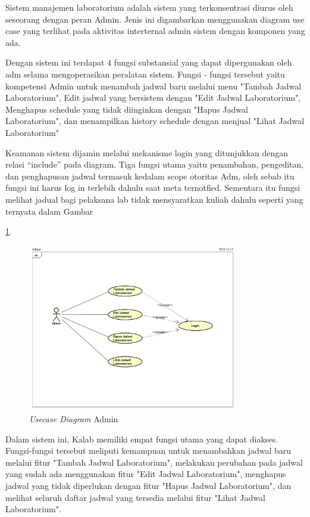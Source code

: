Sistem manajemen laboratorium adalah sistem yang terkonsentrasi diurus oleh seseorang dengan peran Admin. Jenis ini digambarkan menggunakan diagram use case yang terlihat pada aktivitas interternal admin sistem dengan komponen yang ada.

Dengan sistem ini terdapat 4 fungsi substansial yang dapat dipergunakan oleh adm selama mengoperasikan peralatan sistem. Fungsi - fungsi tersebut yaitu kompetensi Admin untuk menambah jadwal baru melalui menu "Tambah Jadwal Laboratorium", Edit jadwal yang bersistem dengan "Edit Jadwal Laboratorium", Menghapus schedule yang tidak diinginkan dengan "Hapus Jadwal Laboratorium", dan menampilkan history schedule dengan menjual "Lihat Jadwal Laboratorium"

Keamanan sistem dijamin melalui mekanisme login yang ditunjukkan dengan relasi “include” pada diagram. Tiga fungsi utama yaitu penambahan, pengeditan, dan penghapusan jadwal termasuk kedalam scope otoritas Adm, oleh sebab itu fungsi ini harus log in terlebih dahulu saat meta ternotfied. Sementara itu fungsi melihat jadual bagi pelaksana lab tidak mensyaratkan kuliah dahulu seperti yang ternyata dalam Gambar

\ref{usecase-diagram-admin}.
\begin{figure}
	\centering
	\includegraphics[width=0.82\textwidth]{konten/gambar/usecase-diagram/admin.png}
	\caption{\textit{Usecase Diagram} Admin}
	\label{usecase-diagram-admin}
\end{figure}

Dalam sistem ini, Kalab memiliki empat fungsi utama yang dapat diakses. Fungsi-fungsi tersebut meliputi kemampuan untuk menambahkan jadwal baru melalui fitur "Tambah Jadwal Laboratorium", melakukan perubahan pada jadwal yang sudah ada menggunakan fitur "Edit Jadwal Laboratorium", menghapus jadwal yang tidak diperlukan dengan fitur "Hapus Jadwal Laboratorium", dan melihat seluruh daftar jadwal yang tersedia melalui fitur "Lihat Jadwal Laboratorium".

